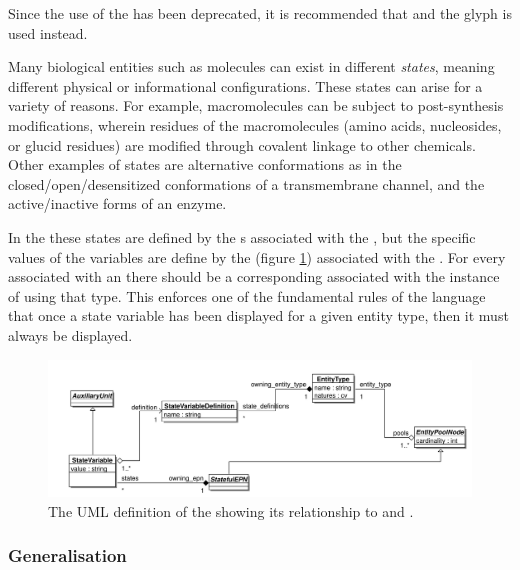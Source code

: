 Since the use of the  has been deprecated,
it is recommended that  and the
 glyph is used instead.

\label{defn:StateVariable}

Many biological entities such as molecules can exist in different
\emph{states}, meaning different physical or informational
configurations.  These states can arise for a variety of reasons.  For
example, macromolecules can be subject to post-synthesis
modifications, wherein residues of the macromolecules (amino acids,
nucleosides, or glucid residues) are modified through covalent linkage
to other chemicals.  Other examples of states are alternative
conformations as in the closed/open/de\-sen\-si\-tized conformations of a
transmembrane channel, and the active/inactive forms of an enzyme.

In the \PDl these states are defined by the
s associated with the
, but the specific values of the variables are
define by the  (figure
\ref{fig:techref:statevariableviewuml}) associated with the
. For every
 associated with an
 there should be a corresponding
 associated with the instance of
 using that type. This enforces one of the
fundamental rules of the language that once a state variable has been
displayed for a given entity type, then it must always be displayed.

\begin{figure}[htb]
  \centering
  \includegraphics[width = \textwidth]{images/statevariableviewuml}
  \caption{The UML definition of the  showing
    its relationship to  and .}
  \label{fig:techref:statevariableviewuml}
\end{figure}

\subsubsection{Generalisation}


